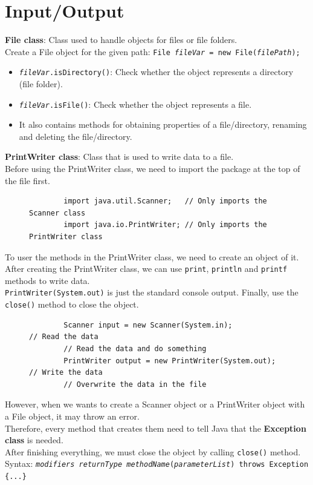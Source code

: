 \documentclass{article}
\begin{document}
\null
\newpage
\section{Input/Output}
\textbf{File class}: Class used to handle objects for files or file folders.\\
Create a File object for the given path: \texttt{File \textit{fileVar} = new File(\textit{filePath});}
\begin{itemize}
	\item \texttt{\textit{fileVar}.isDirectory()}: Check whether the object represents a directory (file folder).
	\item \texttt{\textit{fileVar}.isFile()}: Check whether the object represents a file.
	\item It also contains methods for obtaining properties of a file/directory, renaming and deleting the file/directory.
\end{itemize}
\textbf{PrintWriter class}: Class that is used to write data to a file.\\
Before using the PrintWriter class, we need to import the package at the top of the file first.

\begin{figure}[h]
	\begin{verbatim}
		import java.util.Scanner;   // Only imports the Scanner class
		import java.io.PrintWriter; // Only imports the PrintWriter class
	\end{verbatim}
\end{figure}

To user the methods in the PrintWriter class, we need to create an object of it.\\
After creating the PrintWriter class, we can use \texttt{print}, \texttt{println} and \texttt{printf} methods to write data.\\
\texttt{PrintWriter(System.out)} is just the standard console output.
Finally, use the \texttt{close()} method to close the object.

\begin{figure}[h]
	\begin{verbatim}
		Scanner input = new Scanner(System.in);           // Read the data
		// Read the data and do something
		PrintWriter output = new PrintWriter(System.out); // Write the data
		// Overwrite the data in the file
	\end{verbatim}
\end{figure}

However, when we wants to create a Scanner object or a PrintWriter object with a File object, it may throw an error.\\
Therefore, every method that creates them need to tell Java that the \textbf{Exception class} is needed.\\
After finishing everything, we must close the object by calling \texttt{close()} method.\\
Syntax: \texttt{\textit{modifiers} \textit{returnType} \textit{methodName}(\textit{parameterList}) throws Exception \{...\}}
\end{document}
